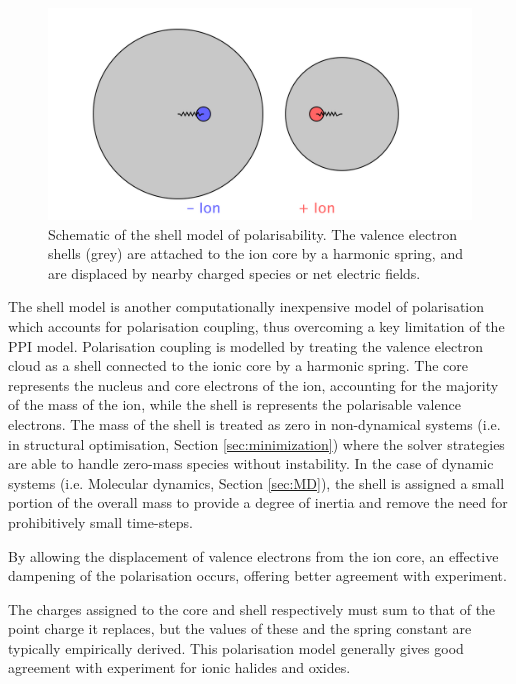 \begin{figure}[ht]
  \centering
  \includegraphics[width=\linewidth]{figures/coreshell/coreshell}
  \caption[Shell model schematic]{Schematic of the shell model of polarisability. The valence electron shells (grey) are attached to the ion core by a harmonic spring, and are displaced by nearby charged species or net electric fields.}
\end{figure}
The shell model\cite{Dick1958} is another computationally inexpensive model of polarisation which accounts for polarisation coupling, thus overcoming a key limitation of the PPI model.
Polarisation coupling is modelled by treating the valence electron cloud as a shell connected to the ionic core by a harmonic spring.
The core represents the nucleus and core electrons of the ion, accounting for the majority of the mass of the ion, while the shell is represents the polarisable valence electrons.
The mass of the shell is treated as zero in non-dynamical systems (i.e. in structural optimisation, Section \ref{sec:minimization}) where the solver strategies are able to handle zero-mass species without instability.
In the case of dynamic systems (i.e. Molecular dynamics, Section \ref{sec:MD}), the shell is assigned a small portion of the overall mass to provide a degree of inertia and remove the need for prohibitively small time-steps.

By allowing the displacement of valence electrons from the ion core, an effective dampening of the polarisation occurs, offering better agreement with experiment.

The charges assigned to the core and shell respectively must sum to that of the point charge it replaces, but the values of these and the spring constant are typically empirically derived.
This polarisation model generally gives good agreement with experiment for ionic halides and oxides.

\newpage
